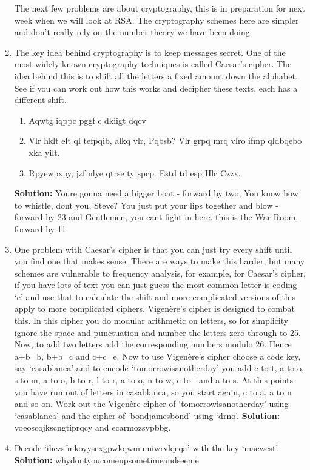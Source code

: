 \documentclass[12pt]{article}
\begin{document}
\begin{enumerate}
The next few problems are about cryptography, this is in preparation
for next week when we will look at RSA. The cryptography schemes here
are simpler and don't really rely on the number theory we have been
doing.

\item The key idea behind cryptography is to keep messages secret. One
  of the most widely known cryptography techniques is called Caesar's
  cipher. The idea behind this is to shift all the letters a fixed
  amount down the alphabet. See if you can work out how this works and
  decipher these texts, each has a different shift.
\begin{enumerate}
\item Aqwtg iqppc pggf c dkiigt dqcv
\item Vlr hklt elt ql tefpqib, alkq vlr, Pqbsb? Vlr grpq mrq vlro ifmp qldbqebo xka yilt.
\item Rpyewpxpy, jzf nlye qtrse ty spcp. Estd td esp Hlc Czzx.
\end{enumerate}
\textbf{Solution: } Youre gonna need a bigger boat - forward by two,
You know how to whistle, dont you, Steve? You just put your lips
together and blow - forward by 23 and Gentlemen, you cant fight in
here. this is the War Room, forward by 11.

\item One problem with Caesar's cipher is that you can just try every
  shift until you find one that makes sense. There are ways to make
  this harder, but many schemes are vulnerable to frequency analysis,
  for example, for Caesar's cipher, if you have lots of text you can
  just guess the most common letter is coding \lq{}e\rq{} and use that
  to calculate the shift and more complicated versions of this apply
  to more complicated ciphers. Vigen\`{e}re's cipher is designed to
  combat this. In this cipher you do modular arithmetic on letters, so
  for simplicity ignore the space and punctuation and number the
  letters zero through to 25. Now, to add two letters add the
  corresponding numbers modulo 26. Hence a+b=b, b+b=c and c+c=e. Now
  to use Vigen\`{e}re's cipher choose a code key, say
  \lq{}casablanca\rq{} and to encode \lq{}tomorrowisanotherday\rq{}
  you add c to t, a to o, s to m, a to o, b to r, l to r, a to o, n to
  w, c to i and a to s. At this points you have run out of letters in
  casablanca, so you start again, c to a, a to n and so on. Work out
  the Vigen\`{e}re cipher of \lq{}tomorrowisanotherday\rq{} using
  \lq{}casablanca\rq{} and the cipher of \lq{}bondjamesbond\rq{} using
  \lq{}drno\rq{}. \textbf{Solution: } voeoscojkscngtiprqcy and ecarmozsvpbbg.

\item Decode \lq{}ihczsfmkoyysexgpwkqwmumiwrvlqeqa\rq{} with the key \lq{}maewest\rq{}. \textbf{Solution: } whydontyoucomeupsometimeandseeme


\end{enumerate}
\end{document}
